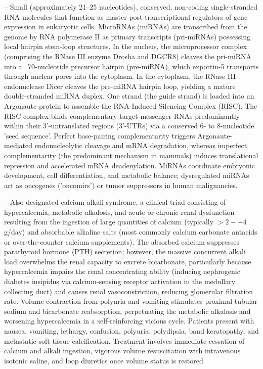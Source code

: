 -- Small (approximately 21--25 nucleotides), conserved, non-coding single-stranded RNA molecules that function as master post-transcriptional regulators of gene expression in eukaryotic cells. MicroRNAs (miRNAs) are transcribed from the genome by RNA polymerase II as primary transcripts (pri-miRNAs) possessing local hairpin stem-loop structures. In the nucleus, the microprocessor complex (comprising the RNase III enzyme Drosha and DGCR8) cleaves the pri-miRNA into a ~70-nucleotide precursor hairpin (pre-miRNA), which exportin-5 transports through nuclear pores into the cytoplasm. In the cytoplasm, the RNase III endonuclease Dicer cleaves the pre-miRNA hairpin loop, yielding a mature double-stranded miRNA duplex. One strand (the guide strand) is loaded into an Argonaute protein to assemble the RNA-Induced Silencing Complex (RISC). The RISC complex binds complementary target messenger RNAs predominantly within their 3'-untranslated regions (3'-UTRs) via a conserved 6- to 8-nucleotide 'seed sequence'. Perfect base-pairing complementarity triggers Argonaute-mediated endonucleolytic cleavage and mRNA degradation, whereas imperfect complementarity (the predominant mechanism in mammals) induces translational repression and accelerated mRNA deadenylation. MiRNAs coordinate embryonic development, cell differentiation, and metabolic balance; dysregulated miRNAs act as oncogenes ('oncomirs') or tumor suppressors in human malignancies.

-- Also designated calcium-alkali syndrome, a clinical triad consisting of hypercalcemia, metabolic alkalosis, and acute or chronic renal dysfunction resulting from the ingestion of large quantities of calcium (typically $>2--4$ g/day) and absorbable alkaline salts (most commonly calcium carbonate antacids or over-the-counter calcium supplements). The absorbed calcium suppresses parathyroid hormone (PTH) secretion; however, the massive concurrent alkali load overwhelms the renal capacity to excrete bicarbonate, particularly because hypercalcemia impairs the renal concentrating ability (inducing nephrogenic diabetes insipidus via calcium-sensing receptor activation in the medullary collecting duct) and causes renal vasoconstriction, reducing glomerular filtration rate. Volume contraction from polyuria and vomiting stimulates proximal tubular sodium and bicarbonate reabsorption, perpetuating the metabolic alkalosis and worsening hypercalcemia in a self-reinforcing vicious cycle. Patients present with nausea, vomiting, lethargy, confusion, polyuria, polydipsia, band keratopathy, and metastatic soft-tissue calcification. Treatment involves immediate cessation of calcium and alkali ingestion, vigorous volume resuscitation with intravenous isotonic saline, and loop diuretics once volume status is restored.

